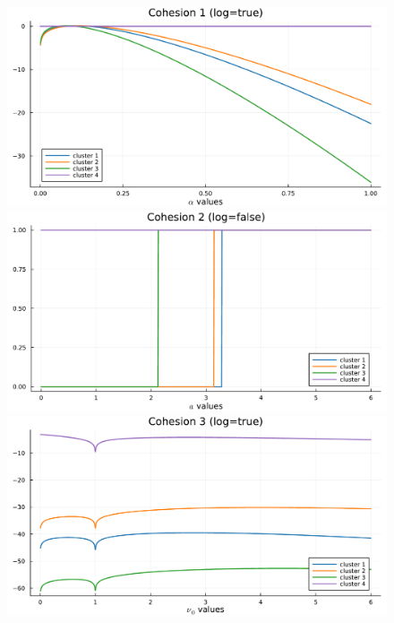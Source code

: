 \documentclass[12pt,	%
	a4paper,		%
	twoside,		%
	openright,		%
	titlepage,%
	]{book}
\theoremstyle{definition}
\begin{document}
\begin{figure}[!p]
\centering
    \includegraphics[width=1\linewidth]{model description/spatial cohesion analysis/cohesion1.pdf}\\
    \includegraphics[width=1\linewidth]{model description/spatial cohesion analysis/cohesion2.pdf}\\
    \includegraphics[width=1\linewidth]{model description/spatial cohesion analysis/cohesion3.pdf}

\end{figure}
\end{document}
